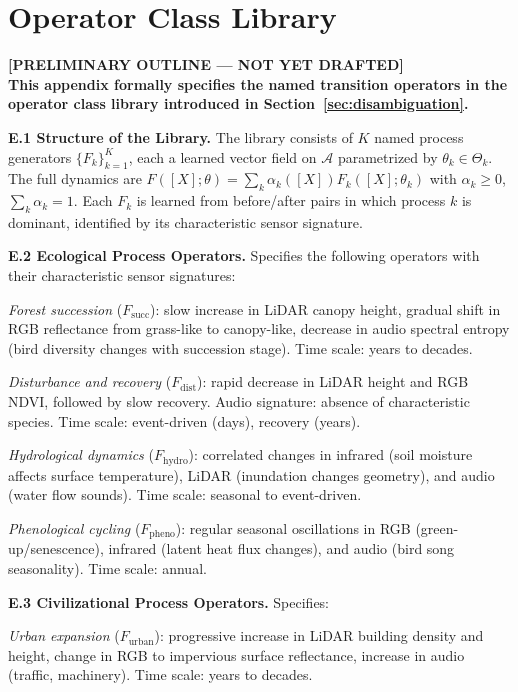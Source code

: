 \documentclass[12pt, oneside]{article}
\newcommand{\preliminary}[1]{%
  \colorbox{yellow!20}{\parbox{\dimexpr\linewidth-2\fboxsep}{%
    \textbf{\textcolor{red!70!black}{[PRELIMINARY OUTLINE --- NOT YET DRAFTED]}}\\[4pt]
    #1
  }}%
}
\begin{document}
\section{Operator Class Library}
\label{app:operators}

\preliminary{
\textbf{This appendix formally specifies the named transition operators in the operator
class library introduced in Section~\ref{sec:disambiguation}.}

\medskip
\textbf{E.1 Structure of the Library.}
The library consists of $K$ named process generators $\{F_k\}_{k=1}^K$, each a learned
vector field on $\mathcal{A}$ parametrized by $\theta_k \in \Theta_k$. The full dynamics
are $F([X];\theta) = \sum_k \alpha_k([X]) F_k([X];\theta_k)$ with
$\alpha_k \ge 0$, $\sum_k \alpha_k = 1$. Each $F_k$ is learned from before/after pairs
in which process $k$ is dominant, identified by its characteristic sensor signature.

\medskip
\textbf{E.2 Ecological Process Operators.}
Specifies the following operators with their characteristic sensor signatures:

\textit{Forest succession} ($F_{\mathrm{succ}}$): slow increase in LiDAR canopy height,
gradual shift in RGB reflectance from grass-like to canopy-like, decrease in audio
spectral entropy (bird diversity changes with succession stage). Time scale: years to
decades.

\textit{Disturbance and recovery} ($F_{\mathrm{dist}}$): rapid decrease in LiDAR height
and RGB NDVI, followed by slow recovery. Audio signature: absence of characteristic
species. Time scale: event-driven (days), recovery (years).

\textit{Hydrological dynamics} ($F_{\mathrm{hydro}}$): correlated changes in infrared
(soil moisture affects surface temperature), LiDAR (inundation changes geometry), and
audio (water flow sounds). Time scale: seasonal to event-driven.

\textit{Phenological cycling} ($F_{\mathrm{pheno}}$): regular seasonal oscillations in
RGB (green-up/senescence), infrared (latent heat flux changes), and audio (bird song
seasonality). Time scale: annual.

\medskip
\textbf{E.3 Civilizational Process Operators.}
Specifies:

\textit{Urban expansion} ($F_{\mathrm{urban}}$): progressive increase in LiDAR building
density and height, change in RGB to impervious surface reflectance, increase in audio
(traffic, machinery). Time scale: years to decades.

}
\end{document}
